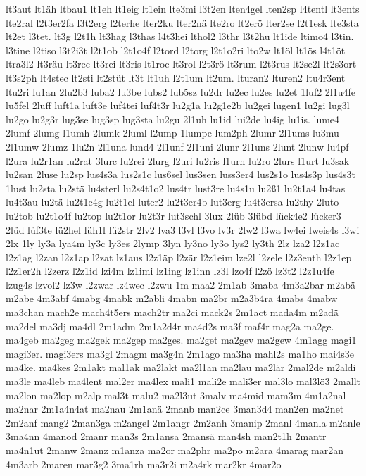 {lt3aut
lt1äh
ltbau1
lt1eh
lt1eig
lt1ein
lte3mi
l3t2en
lten4gel
lten2sp
l4tentl
lt3ents
lte2ral
l2t3er2fa
l3t2erg
l2terhe
lter2ku
lter2nä
lte2ro
lt2erö
lter2se
l2t1esk
lte3sta
lt2et
l3tet.
lt3g
l2t1h
lt3hag
l3thas
l4t3hei
lthol2
l3thr
l3t2hu
lt1ide
ltimo4
l3tin.
l3tine
l2tiso
l3t2i3t
l2t1ob
l2t1o4f
l2tord
l2torg
l2t1o2ri
lto2w
lt1öl
lt1ös
l4t1öt
ltra3l2
lt3räu
lt3rec
lt3rei
lt3ris
lt1roc
lt3rol
l2t3rö
lt3rum
l2t3rus
lt2se2l
lt2s3ort
lt3s2ph
lt4stec
lt2sti
lt2stüt
lt3t
lt1uh
l2t1um
lt2um.
lturan2
lturen2
ltu4r3ent
ltu2ri
lu1an
2lu2b3
luba2
lu3be
lubs2
lub5sz
lu2dr
lu2ec
lu2es
lu2et
1luf2
2l1u4fe
lu5fel
2luff
luft1a
luft3e
luf4tei
luf4t3r
lu2g1a
lu2g1e2b
lu2gei
lugen1
lu2gi
lug3l
lu2go
lu2g3r
lug3se
lug3sp
lug3sta
lu2gu
2l1uh
lu1id
lui2de
lu4ig
lu1is.
lume4
2lumf
2lumg
l1umh
2lumk
2luml
l2ump
1lumpe
lum2ph
2lumr
2l1ums
lu3mu
2l1umw
2lumz
1lu2n
2l1una
lund4
2l1unf
2l1uni
2lunr
2l1uns
2lunt
2lunw
lu4pf
l2ura
lu2r1an
lu2rat
3lurc
lu2rei
2lurg
l2uri
lu2ris
l1urn
lu2ro
2lurs
l1urt
lu3sak
lu2san
2luse
lu2sp
lus4s3a
lus2s1c
lus6sel
lus3sen
luss3er4
lus2s1o
lus4s3p
lus4s3t
1lust
lu2sta
lu2stä
lu4sterl
lu2s4t1o2
lus4tr
lust3re
lu4s1u
lu2ß1
lu2t1a4
lu4tas
lu4t3au
lu2tä
lu2t1e4g
lu2t1el
luter2
lu2t3er4b
lut3erg
lu4t3ersa
lu2thy
2luto
lu2tob
lu2t1o4f
lu2top
lu2t1or
lu2t3r
lut3schl
3lux
2lüb
3lübd
lück4e2
lücker3
2lüd
lüf3te
lü2hel
lüh1l
lü2str
2lv2
lva3
l3vl
l3vo
lv3r
2lw2
l3wa
lw4ei
lweis4s
l3wi
2lx
1ly
ly3a
lya4m
ly3c
ly3es
2lymp
3lyn
ly3no
ly3o
lys2
ly3th
2lz
lza2
l2z1ac
l2z1ag
l2zan
l2z1ap
l2zat
lz1aus
l2z1äp
l2zär
l2z1eim
lze2l
l2zele
l2z3enth
l2z1ep
l2z1er2h
l2zerz
l2z1id
lzi4m
lz1imi
lz1ing
lz1inn
lz3l
lzo4f
l2zö
lz3t2
l2z1u4fe
lzug4s
lzvol2
lz3w
l2zwar
lz4wec
l2zwu
1m
maa2
2m1ab
3maba
4m3a2bar
m2abä
m2abe
4m3abf
4mabg
4mabk
m2abli
4mabn
ma2br
m2a3b4ra
4mabs
4mabw
ma3chan
mach2e
mach4t5ers
mach2tr
ma2ci
mack2s
2m1act
mada4m
m2adä
ma2del
ma3dj
ma4dl
2m1adm
2m1a2d4r
ma4d2s
ma3f
maf4r
mag2a
ma2ge.
ma4geb
ma2geg
ma2gek
ma2gep
ma2ges.
ma2get
ma2gev
ma2gew
4m1agg
magi1
magi3er.
magi3ers
ma3gl
2magm
ma3g4n
2m1ago
ma3ha
mahl2s
ma1ho
mai4s3e
ma4ke.
ma4kes
2m1akt
mal1ak
ma2lakt
ma2l1an
ma2lau
ma2lär
2mal2de
m2aldi
ma3le
ma4leb
ma4lent
mal2er
ma4lex
mali1
mali2e
mali3er
mal3lo
mal3lö3
2mallt
ma2lon
ma2lop
m2alp
mal3t
malu2
ma2l3ut
3malv
ma4mid
mam3m
4m1a2nal
ma2nar
2m1a4n4at
ma2nau
2m1anä
2manb
man2ce
3man3d4
man2en
ma2net
2m2anf
mang2
2man3ga
m2angel
2m1angr
2m2anh
3manip
2manl
4manla
m2anle
3ma4nn
4manod
2manr
man3s
2m1ansa
2mansä
man4sh
man2t1h
2mantr
ma4n1ut
2manw
2manz
m1anza
ma2or
ma2phr
ma2po
m2ara
4marag
mar2an
4m3arb
2maren
mar3g2
3ma1rh
ma3r2i
m2a4rk
mar2kr
4mar2o
}
